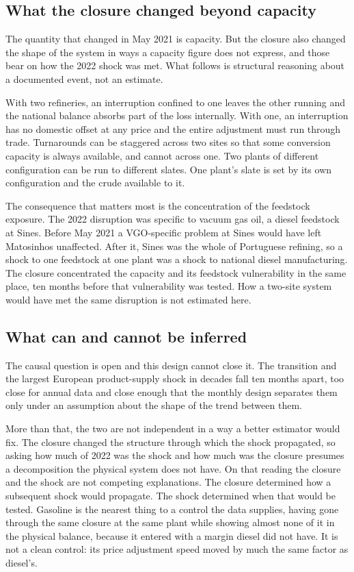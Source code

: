 \documentclass[11pt,a4paper]{article}
\begin{document}
\subsection{What the closure changed beyond capacity}

The quantity that changed in May 2021 is capacity. But the closure also changed the shape of the
system in ways a capacity figure does not express, and those bear on how the 2022 shock was met.
What follows is structural reasoning about a documented event, not an estimate.

With two refineries, an interruption confined to one leaves the other running and the national
balance absorbs part of the loss internally. With one, an interruption has no domestic offset at
any price and the entire adjustment must run through trade. Turnarounds can be staggered across
two sites so that some conversion capacity is always available, and cannot across one. Two plants
of different configuration can be run to different slates. One plant's slate is set by its own
configuration and the crude available to it.

The consequence that matters most is the concentration of the feedstock exposure. The 2022
disruption was specific to vacuum gas oil, a diesel feedstock at Sines. Before May 2021 a
VGO-specific problem at Sines would have left Matosinhos unaffected. After it, Sines was the whole
of Portuguese refining, so a shock to one feedstock at one plant was a shock to national diesel
manufacturing. The closure concentrated the capacity and its feedstock vulnerability in the same place,
ten months before that vulnerability was tested. How a two-site system would have met the same
disruption is not estimated here.

\subsection{What can and cannot be inferred}

The causal question is open and this design cannot close it. The transition and the largest
European product-supply shock in decades fall ten months apart, too close for annual data and
close enough that the monthly design separates them only under an assumption about the shape of
the trend between them.

More than that, the two are not independent in a way a better estimator would fix. The closure
changed the structure through which the shock propagated, so asking how much of 2022 was the
shock and how much was the closure presumes a decomposition the physical system does not have.
On that reading the closure and the shock are not competing explanations. The closure determined
how a subsequent shock would propagate. The shock determined when that would be tested. Gasoline
is the nearest thing to a control the data supplies, having gone through the same closure at
the same plant while showing almost none of it in the physical balance, because it entered with
a margin diesel did not have. It is not a clean control: its price adjustment speed moved by
much the same factor as diesel's.
\end{document}
